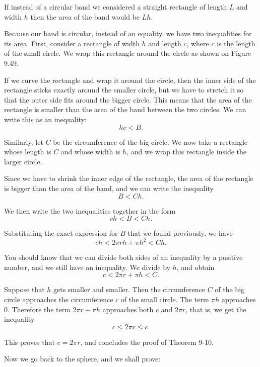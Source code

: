 \documentclass[12pt]{book} %
\begin{document}
If instead of a circular band we considered a straight rectangle of length $L$ and width $h$ then the area of the band would be $Lh$.


Because our band is circular, instead of an equality, we have two inequalities for its area. First, consider a rectangle of width $h$ and length $c$, where $c$ is the length of the small circle. We wrap this rectangle around the circle as shown on Figure 9.49.


If we curve the rectangle and wrap it around the circle, then the inner side of the rectangle sticks exactly around the smaller circle, but we have to stretch it so that the outer side fits around the bigger circle. This means that the area of the rectangle is smaller than the area of the band between the two circles. We can write this as an inequality:
\[
hc<B.
\]

Similarly, let $C$ be the circumference of the big circle. We now take a rectangle whose length is $C$ and whose width is $h$, and we wrap this rectangle inside the larger circle.


Since we have to shrink the inner edge of the rectangle, the area of the rectangle is bigger than the area of the band, and we can write the inequality
\[
B<Ch.
\]

We then write the two inequalities together in the form
\[
ch<B<Ch.
\]

Substituting the exact expression for $B$ that we found previously, we have
\[
ch<2\pi rh+\pi h^2<Ch.
\]

You should know that we can divide both sides of an inequality by a positive number, and we still have an inequality. We divide by $h$, and obtain
\[
c<2\pi r+\pi h<C.
\]

Suppose that $h$ gets smaller and smaller. Then the circumference $C$ of the big circle approaches the circumference $c$ of the small circle. The term $\pi h$ approaches $0$. Therefore the term $2\pi r+\pi h$ approaches both $c$ and $2\pi r$, that is, we get the inequality
\[
c\le 2\pi r\le c.
\]

This proves that $c=2\pi r$, and concludes the proof of Theorem 9-10.

Now we go back to the sphere, and we shall prove:

\end{document}
